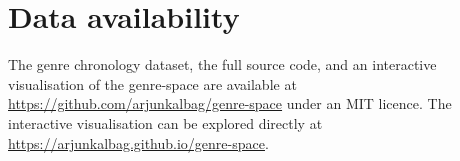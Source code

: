\documentclass[12pt, a4paper]{article}
\begin{document}
\section*{Data availability}

The genre chronology dataset, the full source code, and an interactive
visualisation of the genre-space are available at
\url{https://github.com/arjunkalbag/genre-space} under an MIT licence.
The interactive visualisation can be explored directly at
\url{https://arjunkalbag.github.io/genre-space}.



\end{document}

